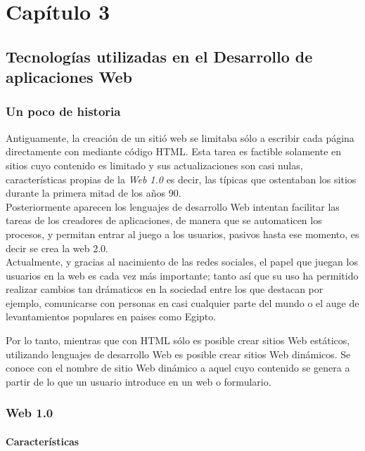 \chapter{Capítulo 3}


\section{Tecnologías utilizadas en el Desarrollo de aplicaciones Web}

\subsection{Un poco de historia}
Antiguamente, la creación de un sitió web se limitaba sólo  a escribir cada 
página directamente con mediante código HTML. Esta tarea es factible solamente
en sitios cuyo contenido es limitado y sus actualizaciones son casi nulas,
características propias de la \textit{Web 1.0} es decir, las típicas  que ostentaban 
los sitios durante la primera mitad de los años 90.\\

Posteriormente aparecen los lenguajes de desarrollo Web intentan facilitar las 
tareas de los creadores de aplicaciones, de manera que se automaticen los procesos, 
y permitan entrar al juego a los usuarios, pasivos hasta ese momento, es decir
se crea la web 2.0.\\

Actualmente, y gracias al nacimiento de las redes sociales, el papel que juegan los 
usuarios en la web es cada vez más importante; tanto así que su uso ha permitido realizar 
cambios tan drámaticos en la sociedad entre los que destacan por ejemplo, comunicarse 
con personas en casi cualquier parte del mundo o el auge de levantamientos populares en 
paises como Egipto. 

Por lo tanto, mientras que con HTML sólo es posible crear sitios Web estáticos, 
utilizando lenguajes de desarrollo Web es posible crear sitios Web dinámicos. Se 
conoce con el nombre de sitio Web dinámico a aquel cuyo contenido se genera a partir 
de lo que un usuario introduce en un web o formulario. 


\subsection{Web 1.0}

\subsubsection{Características}

